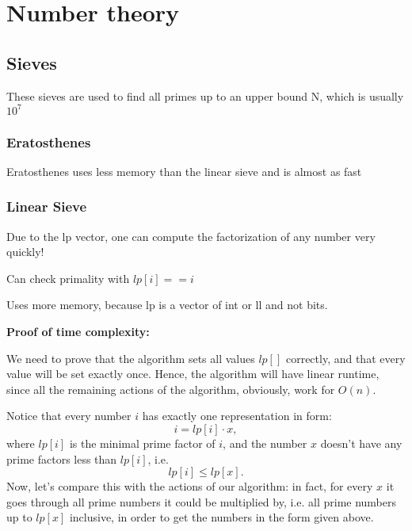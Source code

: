 \chapter{Number theory}

\section{Sieves}

    These sieves are used to find all primes up to an upper bound N, which is usually $10^7$

    \subsection{Eratosthenes}

        Eratosthenes uses less memory than the linear sieve and is almost as fast


    \subsection{Linear Sieve}

        Due to the lp vector, one can compute the factorization of any number very quickly!

        Can check primality with $lp[i] == i$

        Uses more memory, because lp is a vector of int or ll and not bits.

        \textbf{Proof of time complexity:}

        We need to prove that the algorithm sets all values
        $lp[]$ correctly, and that every value will be set exactly once. 
        Hence, the algorithm will have linear runtime, since all the remaining actions of the algorithm, obviously, work for
        $O(n)$.

        Notice that every number $i$ has exactly one representation in form:
        $$i = lp [i] \cdot x,$$
        where 
        $lp [i]$ is the minimal prime factor of 
        $i$, and the number 
        $x$ doesn't have any prime factors less than 
        $lp [i]$, i.e.
        $$lp [i] \le lp [x].$$
        Now, let's compare this with the actions of our algorithm: in fact, for every 
        $x$ it goes through all prime numbers it could be multiplied by, i.e. all prime numbers up to 
        $lp [x]$ inclusive, in order to get the numbers in the form given above.


